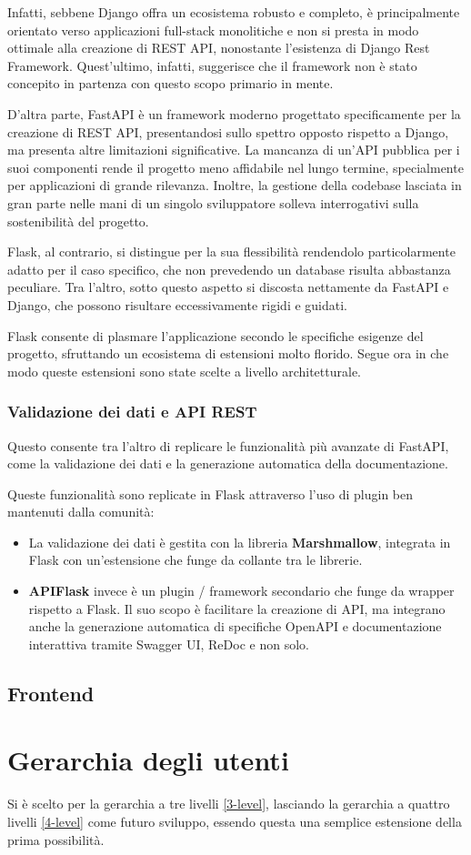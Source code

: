 Infatti, sebbene Django offra un ecosistema robusto e completo, è principalmente orientato verso applicazioni full-stack monolitiche e non si presta in modo ottimale alla creazione di REST API, nonostante l'esistenza di Django Rest Framework. Quest'ultimo, infatti, suggerisce che il framework non è stato concepito in partenza con questo scopo primario in mente.

D'altra parte, FastAPI è un framework moderno progettato specificamente per la creazione di REST API, presentandosi sullo spettro opposto rispetto a Django, ma presenta altre limitazioni significative. La mancanza di un'API pubblica per i suoi componenti rende il progetto meno affidabile nel lungo termine, specialmente per applicazioni di grande rilevanza. Inoltre, la gestione della codebase lasciata in gran parte nelle mani di un singolo sviluppatore solleva interrogativi sulla sostenibilità del progetto.

Flask, al contrario, si distingue per la sua flessibilità rendendolo particolarmente adatto per il caso specifico, che non prevedendo un database risulta abbastanza peculiare. Tra l'altro, sotto questo aspetto si discosta nettamente da FastAPI e Django, che possono risultare eccessivamente rigidi e guidati.

Flask consente di plasmare l'applicazione secondo le specifiche esigenze del progetto, sfruttando un ecosistema di estensioni molto florido. Segue ora in che modo queste estensioni sono state scelte a livello architetturale.

\subsubsection{Validazione dei dati e API REST}
Questo consente tra l'altro di replicare le funzionalità più avanzate di FastAPI, come la validazione dei dati e la generazione automatica della documentazione.

Queste funzionalità sono replicate in Flask attraverso l'uso di plugin ben mantenuti dalla comunità:
\begin{itemize}
    \item La validazione dei dati è gestita con la libreria \textbf{Marshmallow}, integrata in Flask con un'estensione che funge da collante tra le librerie.
    \item \textbf{APIFlask} invece è un plugin / framework secondario che funge da wrapper rispetto a Flask. Il suo scopo è facilitare la creazione di API, ma integrano anche la generazione automatica di specifiche OpenAPI e documentazione interattiva tramite Swagger UI, ReDoc e non solo.
\end{itemize}

\subsection{Frontend}

\section{Gerarchia degli utenti}
Si è scelto per la gerarchia a tre livelli \ref{3-level}, lasciando la gerarchia a quattro livelli \ref{4-level} come futuro sviluppo, essendo questa una semplice estensione della prima possibilità.